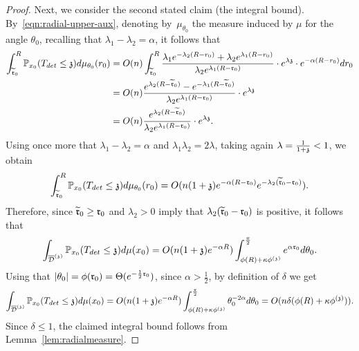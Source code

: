 \begin{proof}
Next, we consider the second stated claim (the integral bound).
By~\eqref{eqn:radial-upper-aux}, denoting by~$\mu_{\theta_0}$ the measure induced by $\mu$ for the angle $\theta_0$, recalling that $\lambda_1-\lambda_2=\alpha$, it follows that
\begin{align*}
\int_{\widetilde{\rabs}_0}^R\P_{x_0}(T_{det}\leq\ss)d\mu_{\theta_0}(r_0)
&= O(n)\int_{\widetilde{\rabs}_0}^R\frac{\lambda_1 e^{-\lambda_2 (R-r_0)}+\lambda_2 e^{\lambda_1(R-r_0)}}{{\lambda_2 e^{\lambda_1(R-\rabs_0)}}}\cdot e^{\lambda\ss}\cdot e^{-\alpha (R-r_0)}dr_0\\
&= O(n)\frac{e^{\lambda_2 (R-\widetilde{\rabs}_0)}-e^{-\lambda_1(R-\widetilde{\rabs}_0)}}{{\lambda_2 e^{\lambda_1(R-\rabs_0)}}}\cdot e^{\lambda\ss} \\
&= O(n) \frac{e^{\lambda_2 (R-\widetilde{\rabs}_0)}}{\lambda_2 e^{\lambda_1 (R-\rabs_0)}}\cdot e^{\lambda\ss}. 
\end{align*}
Using once more that $\lambda_1-\lambda_2=\alpha$ and $\lambda_1\lambda_2=2\lambda$, taking again $\lambda=\frac{1}{1+\ss}< 1$,
we obtain
\[
\int_{\widetilde{\rabs}_0}^{R}\P_{x_0}(T_{det}\leq\ss)d\mu_{\theta_0}(r_0)
= O(n (1+\ss) e^{-\alpha (R-\rabs_0)}e^{-\lambda_2(\widetilde{\rabs}_0-\rabs_0)}).
\]
Therefore, since $\widetilde{\rabs}_0\geq\rabs_0$ and $\lambda_2>0$ imply that 
$\lambda_2(\widetilde{\rabs}_0-\rabs_0)$ is positive, it follows that
\[
  \int_{\ndt}\P_{x_0}(T_{det}\leq \ss)d\mu(x_0)
  = O(n(1+\ss)e^{-\alpha R})\int_{\phi(R)+\kappa\phi^{(\ss)}}^{\frac{\pi}{2}}e^{\alpha\rabs_0}d\theta_0.
\]
Using that $|\theta_0|=\phi(\rabs_0)=\Theta(e^{-\frac12\rabs_0})$, since
  $\alpha>\frac12$, by definition of $\delta$ we get
\[
\int_{\ndt}\P_{x_0}(T_{det}\leq \ss)d\mu(x_0)
  = O(n(1+\ss)e^{-\alpha R})\int_{\phi(R)+\kappa\phi^{(\ss)}}^{\frac{\pi}{2}}\theta_0^{-2\alpha}d\theta_0 
  = O(n\delta(\phi(R)+\kappa\phi^{(\ss)})).
\]
Since $\delta\le 1$, the claimed integral bound follows from Lemma~\ref{lem:radialmeasure}.
\end{proof}

%
